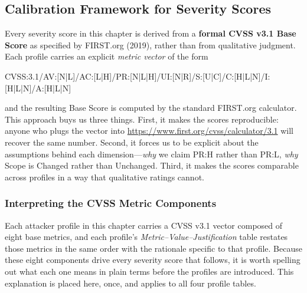 \documentclass[11pt,a4paper]{report}
\begin{document}
\subsection{Calibration Framework for Severity Scores}
\label{ch3:sec:cvss-framework}

Every severity score in this chapter is derived from a \textbf{formal CVSS
v3.1 Base Score} as specified by FIRST.org (2019), rather than from qualitative
judgment. Each profile carries an explicit \emph{metric vector} of the form

\begin{center}
{\ttfamily\scriptsize CVSS:3.1/AV:[N|L]/AC:[L|H]/PR:[N|L|H]/UI:[N|R]/S:[U|C]/C:[H|L|N]/I:[H|L|N]/A:[H|L|N]}
\end{center}

and the resulting Base Score is computed by the standard FIRST.org
calculator. This approach buys us three things. First, it makes the
scores reproducible: anyone who plugs the vector into
\url{https://www.first.org/cvss/calculator/3.1} will recover the same
number. Second, it forces us to be explicit about the assumptions behind
each dimension---\emph{why} we claim PR:H rather than PR:L, \emph{why}
Scope is Changed rather than Unchanged. Third, it makes the scores
comparable across profiles in a way that qualitative ratings cannot.

\subsubsection{Interpreting the CVSS Metric Components}
\label{ch3:sec:cvss-metrics-explained}

Each attacker profile in this chapter carries a CVSS v3.1 vector composed
of eight base metrics, and each profile's \emph{Metric--Value--Justification}
table restates those metrics in the same order with the rationale specific
to that profile. Because these eight components drive every severity score
that follows, it is worth spelling out what each one means in plain terms
before the profiles are introduced. This explanation is placed here, once,
and applies to all four profile tables.
\end{document}

